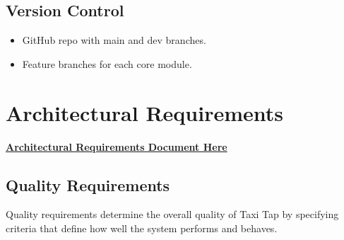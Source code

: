 \documentclass[a4paper,12pt]{article}
\begin{document}
\subsection{Version Control}
\begin{itemize}
    \item GitHub repo with main and dev branches.
    \item Feature branches for each core module.
\end{itemize}

\section{Architectural Requirements}

\textbf{\href{https://github.com/COS301-SE-2025/Taxi-Tap/blob/7a74ddb4e0d0e853188d32b984f07e9f6e0393c3/docs/Architectural\%20Requirements.pdf}{Architectural Requirements Document Here}}

\subsection{Quality Requirements}
Quality requirements determine the overall quality of Taxi Tap by specifying criteria that define how well the system performs and behaves.
\end{document}
